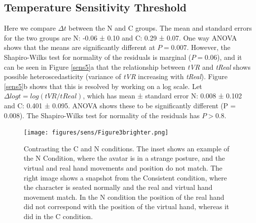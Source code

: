 \documentclass[
		twoside,openright,titlepage,numbers=noenddot,manychapters,
		headinclude,%
                footinclude=false,cleardoublepage=empty,
                BCOR=5mm,
		fontsize=11pt, %
                 enabledeprecatedfontcommands]{scrreprt}
\begin{document}
\subsection{Temperature Sensitivity Threshold }
Here we compare $\Delta t$  between the N and C groups. The mean and standard errors for the two groups are N: -0.06 ± 0.10 and C: 0.29 ± 0.07. One way ANOVA shows that the means are significantly different at $P = 0.007$. However, the Shapiro-Wilks test for normality of the residuals is marginal ($P = 0.06$), and it can be seen in Figure \ref{sens5}a that the relationship between \emph{tVR} and \emph{tReal} shows possible heteroscedasticity (variance of \emph{tVR} increasing with \emph{tReal}). Figure \ref{sens5}b shows that this is resolved by working on a log scale. Let $\Delta log t = log( tVR / tReal )$, which has mean ± standard error N: 0.008 ± 0.102 and C: 0.401 ± 0.095. ANOVA shows these to be significantly different (P = 0.008). The Shapiro-Wilks test for normality of the residuals has $P > 0.8$.



\begin{figure}[]

\begin{center}

\texttt{[image: figures/sens/Figure3brighter.png]}
\caption{Contrasting the C and N conditions. The inset shows an example of the N Condition, where the avatar is in a strange posture, and the virtual and real hand movements and position do not match. The right image shows a snapshot from the Consistent condition, where the character is seated normally and the real and virtual hand movement match. In the N condition the position of the real hand did not correspond with the position of the virtual hand, whereas it did in the C condition. }
\label{sens3}
\end{center}
\end{figure} 
\end{document}
